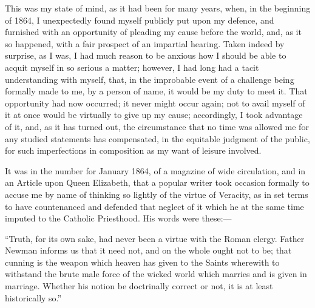 This was my state of mind, as it had been for
many years, when, in the beginning of 1864, I unexpectedly found
myself publicly put upon my defence, and furnished with an opportunity
of pleading my cause before the world, and, as it so happened, with a
fair prospect of an impartial hearing. Taken indeed by surprise, as I
was, I had much reason to be anxious how I should be able to acquit
myself in so serious a matter; however, I had long had a tacit
understanding with myself, that, in the improbable event of a challenge
being formally made to me, by a person of name, it would be my duty to
meet it. That opportunity had now occurred; it never might occur
again; not to avail myself of it at once would be virtually to give up
my cause; accordingly, I took advantage of it, and, as it has turned
out, the circumstance that no time was allowed me for any studied
statements has compensated, in the equitable judgment of the public,
for such imperfections in composition as my want of leisure involved.


It was in the number for January 1864, of a
magazine of wide circulation, and in an Article upon Queen Elizabeth,
that a popular writer took occasion formally to accuse me by name of
thinking so lightly of the virtue of Veracity, as in set terms to have
countenanced and defended that neglect of it which he at the same time
imputed to the Catholic Priesthood. His words were these:—

``Truth, for its own sake, had never been a virtue
with the Roman clergy. Father Newman informs us that it need not, and
on the whole ought not to be; that cunning is the weapon which heaven
has given to the Saints wherewith to withstand the brute male force of
the wicked world which marries and is given in marriage. Whether his
notion be doctrinally correct or not, it is at least historically so.''


